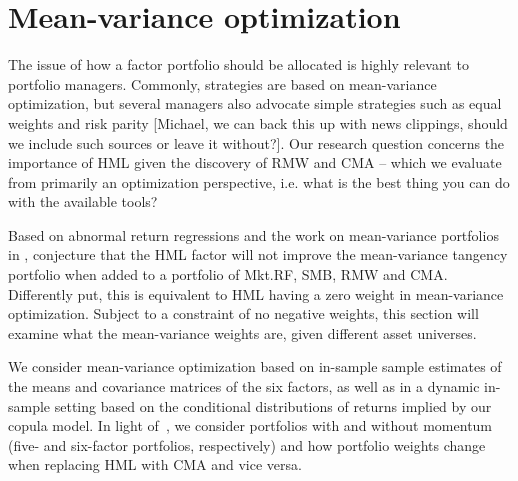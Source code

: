 
\section{Mean-variance optimization}
\label{sec:mean_variance}

The issue of how a factor portfolio should be allocated is highly relevant to portfolio managers. Commonly, strategies are based on mean-variance optimization, but several managers also advocate simple strategies such as equal weights and risk parity [Michael, we can back this up with news clippings, should we include such sources or leave it without?]. Our research question concerns the importance of HML given the discovery of RMW and CMA -- which we evaluate from primarily an optimization perspective, i.e. what is the best thing you can do with the available tools?

Based on abnormal return regressions and the work on mean-variance portfolios in \textcite{HubermanKandel1987}, \textcite{FF2015} conjecture that the HML factor will not improve the mean-variance tangency portfolio when added to a portfolio of Mkt.RF, SMB, RMW and CMA. Differently put, this is equivalent to HML having a zero weight in mean-variance optimization. Subject to a constraint of no negative weights, this section will examine what the mean-variance weights are, given different asset universes.

We consider mean-variance optimization based on in-sample sample estimates of the means and covariance matrices of the six factors, as well as in a dynamic in-sample setting based on the conditional distributions of returns implied by our copula model. In light of~\textcite{Asness2015}, we consider portfolios with and without momentum (five- and six-factor portfolios, respectively) and how portfolio weights change when replacing HML with CMA and vice versa.


